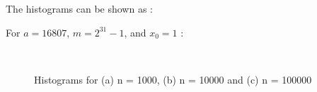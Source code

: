 \documentclass[11pt]{article}
\begin{document}
The histograms can be shown as :

For $a = 16807$, $m = 2^{31} - 1$, and $x_{0} = 1$ :
\begin{figure}[H]
  \centering
  \hspace{10mm}
  \\
    \caption{Histograms for (a) n = 1000, (b) n = 10000 and (c) n = 100000}
\end{figure}
\end{document}
